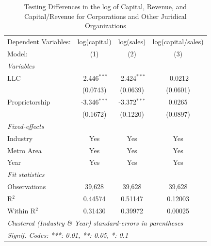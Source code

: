 \documentclass[
  12pt]{article}
\theoremstyle{definition}
\theoremstyle{remark}
\begin{document}
\begin{table}

\caption{\label{tbl-reg-choosing-jo}Testing Differences in the log of
Capital, Revenue, and Capital/Revenue for Corporations and Other
Juridical Organizations}

\begin{minipage}{\linewidth}

\begingroup
\centering
\begin{tabular}{lccc}
   \tabularnewline \midrule \midrule
   Dependent Variables: & log(capital)   & log(sales)     & log(capital/sales)\\  
   Model:               & (1)            & (2)            & (3)\\  
   \midrule
   \emph{Variables}\\
   LLC                  & -2.446$^{***}$ & -2.424$^{***}$ & -0.0212\\   
                        & (0.0743)       & (0.0639)       & (0.0601)\\   
   Proprietorship       & -3.346$^{***}$ & -3.372$^{***}$ & 0.0265\\   
                        & (0.1672)       & (0.1220)       & (0.0897)\\   
   \midrule
   \emph{Fixed-effects}\\
   Industry             & Yes            & Yes            & Yes\\  
   Metro Area           & Yes            & Yes            & Yes\\  
   Year                 & Yes            & Yes            & Yes\\  
   \midrule
   \emph{Fit statistics}\\
   Observations         & 39,628         & 39,628         & 39,628\\  
   R$^2$                & 0.44574        & 0.51147        & 0.12003\\  
   Within R$^2$         & 0.31430        & 0.39972        & 0.00025\\  
   \midrule \midrule
   \multicolumn{4}{l}{\emph{Clustered (Industry \& Year) standard-errors in parentheses}}\\
   \multicolumn{4}{l}{\emph{Signif. Codes: ***: 0.01, **: 0.05, *: 0.1}}\\
\end{tabular}
\par\endgroup

\end{minipage}%

\end{table}%
\end{document}

